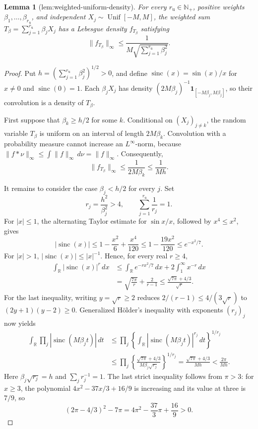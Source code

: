 \documentclass{article}
\newtheorem{lemma}{Lemma}
\begin{document}
\begin{lemma}[lem:weighted-uniform-density]\label{lem:weighted-uniform-density}
For every \(r_{\mathrm u}\in\mathbb N_{+}\), positive weights \(\beta_1,\ldots,\beta_{r_{\mathrm u}}\), and independent \(X_j\sim\operatorname{Unif}[-M,M]\), the weighted sum \(T_\beta=\sum_{j=1}^{r_{\mathrm u}}\beta_jX_j\) has a Lebesgue density \(f_{T_\beta}\) satisfying \[\|f_{T_\beta}\|_\infty\le\frac{1}{M\sqrt{\sum_{j=1}^{r_{\mathrm u}}\beta_j^2}}.\]
\end{lemma}
\begin{proof}
Put \(h=(\sum_{j=1}^{r_{\mathrm u}}\beta_j^2)^{1/2}>0\), and define \(\operatorname{sinc}(x)=\sin(x)/x\) for \(x\ne0\) and \(\operatorname{sinc}(0)=1\).  Each \(\beta_jX_j\) has density \((2M\beta_j)^{-1}\mathbf 1_{[-M\beta_j,M\beta_j]}\), so their convolution is a density of \(T_\beta\).

First suppose that \(\beta_k\ge h/2\) for some \(k\).  Conditional on \((X_j)_{j\ne k}\), the random variable \(T_\beta\) is uniform on an interval of length \(2M\beta_k\).  Convolution with a probability measure cannot increase an \(L^\infty\)-norm, because \(\|f*\nu\|_\infty\le\int\|f\|_\infty\,d\nu=\|f\|_\infty\).  Consequently,
\[
 \|f_{T_\beta}\|_\infty
 \le \frac{1}{2M\beta_k}
 \le \frac{1}{Mh}.
\]

It remains to consider the case \(\beta_j<h/2\) for every \(j\).  Set
\[
 r_j=\frac{h^2}{\beta_j^2}>4,
 \qquad
 \sum_{j=1}^{r_{\mathrm u}}\frac1{r_j}=1.
\]
For \(|x|\le1\), the alternating Taylor estimate for \(\sin x/x\), followed by \(x^4\le x^2\), gives
\[
 |\operatorname{sinc}(x)|
 \le 1-\frac{x^2}{6}+\frac{x^4}{120}
 \le 1-\frac{19x^2}{120}
 \le e^{-x^2/7}.
\]
For \(|x|>1\), \(|\operatorname{sinc}(x)|\le |x|^{-1}\).  Hence, for every real \(r\ge4\),
\[
 \begin{aligned}
 \int_{\mathbb R}|\operatorname{sinc}(x)|^r\,dx
 &\le \int_{\mathbb R}e^{-rx^2/7}\,dx
       +2\int_1^\infty x^{-r}\,dx \\
 &=\sqrt{\frac{7\pi}{r}}+\frac{2}{r-1}
 \le \frac{\sqrt{7\pi}+4/3}{\sqrt r}.
 \end{aligned}
\]
For the last inequality, writing \(y=\sqrt r\ge2\) reduces \(2/(r-1)\le4/(3\sqrt r)\) to \((2y+1)(y-2)\ge0\).  Generalized H\"older's inequality with exponents \((r_j)_j\) now yields
\[
 \begin{aligned}
 \int_{\mathbb R}\prod_j
       |\operatorname{sinc}(M\beta_jt)|\,dt
 &\le \prod_j
   \left\{\int_{\mathbb R}
   |\operatorname{sinc}(M\beta_jt)|^{r_j}\,dt\right\}^{1/r_j} \\
 &\le \prod_j
   \left\{\frac{\sqrt{7\pi}+4/3}
   {M\beta_j\sqrt{r_j}}\right\}^{1/r_j}
 =\frac{\sqrt{7\pi}+4/3}{Mh}
 <\frac{2\pi}{Mh}.
 \end{aligned}
\]
Here \(\beta_j\sqrt{r_j}=h\) and \(\sum_jr_j^{-1}=1\).  The last strict inequality follows from \(\pi>3\): for \(x\ge3\), the polynomial \(4x^2-37x/3+16/9\) is increasing and its value at three is \(7/9\), so
\[
 (2\pi-4/3)^2-7\pi
 =4\pi^2-\frac{37}{3}\pi+\frac{16}{9}>0.
\]


\end{proof}
\end{document}
